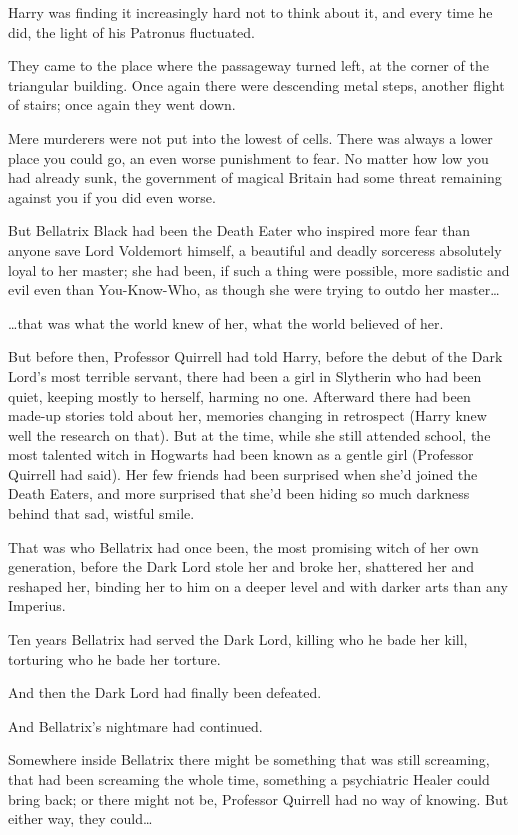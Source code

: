 Harry was finding it increasingly hard not to think about it, and every time he 
did, the light of his Patronus fluctuated.

They came to the place where the passageway turned left, at the corner of the 
triangular building. Once again there were descending metal steps, another 
flight of stairs; once again they went down.

Mere murderers were not put into the lowest of cells. There was always a lower 
place you could go, an even worse punishment to fear. No matter how low you had 
already sunk, the government of magical Britain had some threat remaining 
against you if you did even worse.

But Bellatrix Black had been the Death Eater who inspired more fear than anyone 
save Lord Voldemort himself, a beautiful and deadly sorceress absolutely loyal 
to her master; she had been, if such a thing were possible, more sadistic and 
evil even than You-Know-Who, as though she were trying to outdo her 
master{\ldots}

{\ldots}that was what the world knew of her, what the world believed of her.

But before then, Professor Quirrell had told Harry, before the debut of the 
Dark Lord's most terrible servant, there had been a girl in Slytherin who had 
been quiet, keeping mostly to herself, harming no one. Afterward there had been 
made-up stories told about her, memories changing in retrospect (Harry knew 
well the research on that). But at the time, while she still attended school, 
the most talented witch in Hogwarts had been known as a gentle girl (Professor 
Quirrell had said). Her few friends had been surprised when she'd joined the 
Death Eaters, and more surprised that she'd been hiding so much darkness behind 
that sad, wistful smile.

That was who Bellatrix had once been, the most promising witch of her own 
generation, before the Dark Lord stole her and broke her, shattered her and 
reshaped her, binding her to him on a deeper level and with darker arts than 
any Imperius.

Ten years Bellatrix had served the Dark Lord, killing who he bade her kill, 
torturing who he bade her torture.

And then the Dark Lord had finally been defeated.

And Bellatrix's nightmare had continued.

Somewhere inside Bellatrix there might be something that was still screaming, 
that had been screaming the whole time, something a psychiatric Healer could 
bring back; or there might not be, Professor Quirrell had no way of knowing. 
But either way, they could{\ldots}


